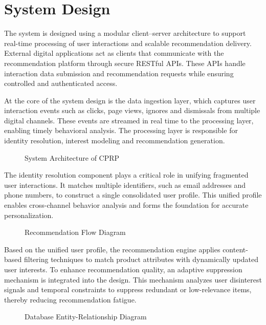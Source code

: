 \documentclass[conference]{IEEEtran}
\begin{document}
\section{System Design}
The system is designed using a modular client--server architecture to support real-time processing of user interactions and scalable recommendation delivery. External digital applications act as clients that communicate with the recommendation platform through secure RESTful APIs. These APIs handle interaction data submission and recommendation requests while ensuring controlled and authenticated access.

At the core of the system design is the data ingestion layer, which captures user interaction events such as clicks, page views, ignores and dismissals from multiple digital channels. These events are streamed in real time to the processing layer, enabling timely behavioral analysis. The processing layer is responsible for identity resolution, interest modeling and recommendation generation.

\begin{figure}[htbp]
\centerline{}
\caption{System Architecture of CPRP}
\label{fig:arch}
\end{figure}

The identity resolution component plays a critical role in unifying fragmented user interactions. It matches multiple identifiers, such as email addresses and phone numbers, to construct a single consolidated user profile. This unified profile enables cross-channel behavior analysis and forms the foundation for accurate personalization.

\begin{figure}[htbp]
\centerline{}
\caption{Recommendation Flow Diagram}
\label{fig:flow}
\end{figure}

Based on the unified user profile, the recommendation engine applies content-based filtering techniques to match product attributes with dynamically updated user interests. To enhance recommendation quality, an adaptive suppression mechanism is integrated into the design. This mechanism analyzes user disinterest signals and temporal constraints to suppress redundant or low-relevance items, thereby reducing recommendation fatigue.

\begin{figure}[htbp]
\centerline{}
\caption{Database Entity-Relationship Diagram}
\label{fig:er}
\end{figure}
\end{document}
